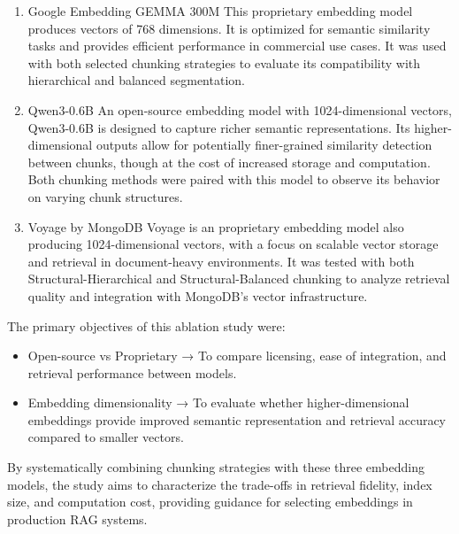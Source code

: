 \begin{enumerate}
	\item Google Embedding GEMMA 300M
	This proprietary embedding model produces vectors of 768 dimensions. It is optimized for semantic similarity tasks and provides efficient performance in commercial use cases. It was used with both selected chunking strategies to evaluate its compatibility with hierarchical and balanced segmentation.
	
	\item Qwen3-0.6B
	An open-source embedding model with 1024-dimensional vectors, Qwen3-0.6B is designed to capture richer semantic representations. Its higher-dimensional outputs allow for potentially finer-grained similarity detection between chunks, though at the cost of increased storage and computation. Both chunking methods were paired with this model to observe its behavior on varying chunk structures.
	
	\item Voyage by MongoDB
	Voyage is an proprietary embedding model also producing 1024-dimensional vectors, with a focus on scalable vector storage and retrieval in document-heavy environments. It was tested with both Structural-Hierarchical and Structural-Balanced chunking to analyze retrieval quality and integration with MongoDB’s vector infrastructure.
\end{enumerate}


The primary objectives of this ablation study were:

\begin{itemize}
	
	\item Open-source vs Proprietary → To compare licensing, ease of integration, and retrieval performance between models.
	
	\item Embedding dimensionality → To evaluate whether higher-dimensional embeddings provide improved semantic representation and retrieval accuracy compared to smaller vectors.
\end{itemize}


By systematically combining chunking strategies with these three embedding models, the study aims to characterize the trade-offs in retrieval fidelity, index size, and computation cost, providing guidance for selecting embeddings in production RAG systems.

